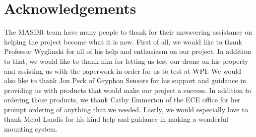 \chapter*{Acknowledgements}

The MASDR team have many people to thank for their unwavering assistance on helping the project become what it is now.  First of all, we would like to thank Professor Wyglinski for all of his help and enthusiasm on our project.  In addition to that, we would like to thank him for letting us test our drone on his property and assisting us with the paperwork in order for us to test at WPI.  We would also like to thank Jon Peck of Gryphon Sensors for his support and guidance in providing us with products that would make our project a success.  In addition to ordering those products, we thank Cathy Emmerton of the ECE office for her prompt ordering of anything that we needed.  Lastly, we would especially love to thank Mead Landis for his kind help and guidance in making a wonderful mounting system.
